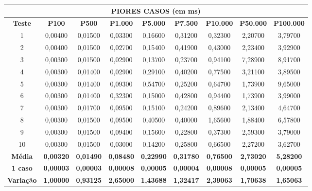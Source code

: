 \documentclass[a4paper, 12pt]{article}
\begin{document}
\begin{tabular}{ccccccccc}

                                                                   \multicolumn{ 9}{c}{{\bf PIORES CASOS (em ms)}} \\
\hline
{\bf Teste} & {\bf P100} & {\bf P500} & {\bf P1.000} & {\bf P5.000} & {\bf P7.500} & {\bf P10.000} & {\bf P50.000} & {\bf P100.000} \\
\hline
         1 &    0,00400 &    0,01500 &    0,03300 &    0,16600 &    0,31200 &    0,32300 &    2,20700 &    3,79700 \\
\hline
         2 &    0,00400 &    0,01500 &    0,02700 &    0,15400 &    0,41900 &    0,43000 &    2,23400 &    3,92900 \\
\hline
         3 &    0,00300 &    0,01500 &    0,02900 &    0,13700 &    0,23700 &    0,94100 &    7,28900 &    8,91700 \\
\hline
         4 &    0,00300 &    0,01400 &    0,02900 &    0,29100 &    0,40200 &    0,77500 &    3,21100 &    3,89500 \\
\hline
         5 &    0,00300 &    0,01400 &    0,09300 &    0,54700 &    0,25200 &    0,64700 &    1,73900 &    9,65000 \\
\hline
         6 &    0,00300 &    0,01400 &    0,32300 &    0,15000 &    0,42800 &    0,94400 &    1,73900 &    3,99000 \\
\hline
         7 &    0,00300 &    0,01700 &    0,09500 &    0,15100 &    0,24200 &    0,89600 &    2,13400 &    4,64700 \\
\hline
         8 &    0,00300 &    0,01500 &    0,09500 &    0,40500 &    0,40000 &    1,65600 &    1,88400 &    6,57800 \\
\hline
         9 &    0,00300 &    0,01500 &    0,09400 &    0,15600 &    0,22800 &    0,37300 &    2,59300 &    3,79000 \\
\hline
        10 &    0,00300 &    0,01500 &    0,03000 &    0,14200 &    0,25800 &    0,66500 &    2,27200 &    3,62700 \\
\hline
{\bf Média} & {\bf 0,00320} & {\bf 0,01490} & {\bf 0,08480} & {\bf 0,22990} & {\bf 0,31780} & {\bf 0,76500} & {\bf 2,73020} & {\bf 5,28200} \\
\hline
{\bf 1 caso} & {\bf 0,00003} & {\bf 0,00003} & {\bf 0,00008} & {\bf 0,00005} & {\bf 0,00004} & {\bf 0,00008} & {\bf 0,00005} & {\bf 0,00005} \\
\hline
{\bf Variação} & {\bf 1,00000} & {\bf 0,93125} & {\bf 2,65000} & {\bf 1,43688} & {\bf 1,32417} & {\bf 2,39063} & {\bf 1,70638} & {\bf 1,65063} \\
\hline
\end{tabular}  
\vspace{0.3cm}
\end{document}

